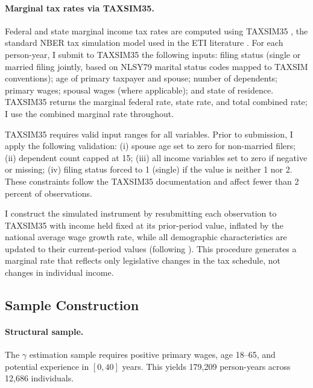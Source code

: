\documentclass[12pt]{article}
\theoremstyle{definition}
\theoremstyle{remark}
\begin{document}
\paragraph{Marginal tax rates via TAXSIM35.} Federal and state marginal income tax rates
are computed using TAXSIM35 \citep{feenberg1993introduction}, the standard NBER tax
simulation model used in the ETI literature \citep{gruber2002elasticity, kopczuk2005tax}.
For each person-year, I submit to TAXSIM35 the following inputs: filing status (single or
married filing jointly, based on NLSY79 marital status codes mapped to TAXSIM conventions);
age of primary taxpayer and spouse; number of dependents; primary wages; spousal wages
(where applicable); and state of residence. TAXSIM35 returns the marginal federal rate,
state rate, and total combined rate; I use the combined marginal rate throughout.

TAXSIM35 requires valid input ranges for all variables. Prior to submission, I apply the
following validation: (i) spouse age set to zero for non-married filers; (ii) dependent
count capped at 15; (iii) all income variables set to zero if negative or missing;
(iv) filing status forced to 1 (single) if the value is neither 1 nor 2. These constraints
follow the TAXSIM35 documentation and affect fewer than 2 percent of observations.

I construct the simulated instrument by resubmitting each observation to TAXSIM35 with
income held fixed at its prior-period value, inflated by the national average wage growth
rate, while all demographic characteristics are updated to their current-period values
(following \citealt{gruber2002elasticity}). This procedure generates a marginal rate that
reflects only legislative changes in the tax schedule, not changes in individual income.

\subsection{Sample Construction}

\paragraph{Structural sample.} The $\gamma$ estimation sample requires positive primary wages,
age 18--65, and potential experience in $[0, 40]$ years. This yields 179,209 person-years
across 12,686 individuals.
\end{document}
